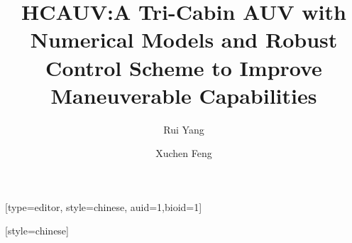\documentclass[a4paper,fleqn]{cas-dc}
\begin{document}
\let\WriteBookmarks\relax
\def\floatpagepagefraction{1}
\def\textpagefraction{.001}



\title [mode = title]{HCAUV:A Tri-Cabin AUV with Numerical Models and Robust Control Scheme to Improve Maneuverable Capabilities}  



%

\author[1]{Rui Yang}[type=editor,
        style=chinese,
        auid=1,bioid=1]
\cormark[1]
\fnmark[1] 





\author[1]{Xuchen Feng}[style=chinese]





\end{document}
